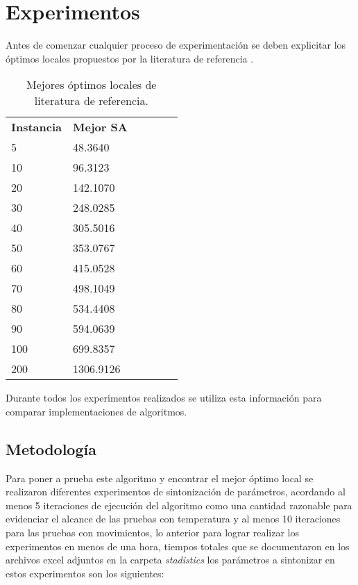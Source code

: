 \section{Experimentos}

Antes de comenzar cualquier proceso de experimentación se deben explicitar los óptimos locales propuestos por la literatura de referencia \cite{sonuc-2017}.

\begin{table}[!ht]
\centering
\begin{tabular}{|l|l|llll}
\cline{1-2}
\textbf{Instancia} & \textbf{Mejor SA} &  &  &  &  \\ \cline{1-2}
5 & 48.3640 &  &  &  &  \\ \cline{1-2}
10 & 96.3123 &  &  &  &  \\ \cline{1-2}
20 & 142.1070 &  &  &  &  \\ \cline{1-2}
30 & 248.0285 &  &  &  &  \\ \cline{1-2}
40 & 305.5016 &  &  &  &  \\ \cline{1-2}
50 & 353.0767 &  &  &  &  \\ \cline{1-2}
60 & 415.0528 &  &  &  &  \\ \cline{1-2}
70 & 498.1049 &  &  &  &  \\ \cline{1-2}
80 & 534.4408 &  &  &  &  \\ \cline{1-2}
90 & 594.0639 &  &  &  &  \\ \cline{1-2}
100 & 699.8357 &  &  &  &  \\ \cline{1-2}
200 & 1306.9126 &  &  &  &  \\ \cline{1-2}
\end{tabular}
\caption{Mejores óptimos locales de literatura de referencia.}
\label{tab:optimos_ref}
\end{table}

Durante todos los experimentos realizados se utiliza esta información para comparar implementaciones de algoritmos.

\subsection{Metodología}

Para poner a prueba este algoritmo y encontrar el mejor óptimo local se realizaron diferentes experimentos de sintonización de parámetros, acordando al menos 5 iteraciones de ejecución del algoritmo como una cantidad razonable para evidenciar el alcance de las pruebas con temperatura y al menos 10 iteraciones para las pruebas con movimientos, lo anterior para lograr realizar los experimentos en menos de una hora, tiempos totales que se documentaron en los archivos excel adjuntos en la carpeta \textit{stadistics} los parámetros a sintonizar en estos experimentos son los siguientes:

